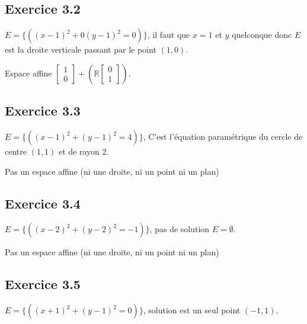 \documentclass[]{book}
\theoremstyle{definition}
\newcommand{\bb}[1]{\mathbb{#1}}
\newcommand{\R}{\bb{R}}
\begin{document}
\subsection*{Exercice 3.2}
$E= \{ ((x-1)^2 + 0(y-1)^2 = 0)\}$, il faut que $x=1$ et $y$ quelconque donc $E$ est la droite verticale passant par le point $(1,0)$.

Espace affine $\begin{bmatrix} 1 \\ 0 \end{bmatrix} + (\R \begin{bmatrix} 0 \\ 1 \end{bmatrix})$.

\subsection*{Exercice 3.3}
$E= \{ ((x-1)^2 + (y-1)^2 = 4)\}$, C'est l'\'equation param\'etrique du cercle de centre $(1,1)$ et de rayon 2.


Pas un espace affine (ni une droite, ni un point ni un plan)

\subsection*{Exercice 3.4}
$E= \{ ((x-2)^2 + (y-2)^2 = -1)\}$, pas de solution $E = \emptyset$.

Pas un espace affine (ni une droite, ni un point ni un plan)

\subsection*{Exercice 3.5}
$E= \{ ((x+1)^2 + (y-1)^2 = 0)\}$, solution est un seul point $(-1,1)$.
\end{document}
